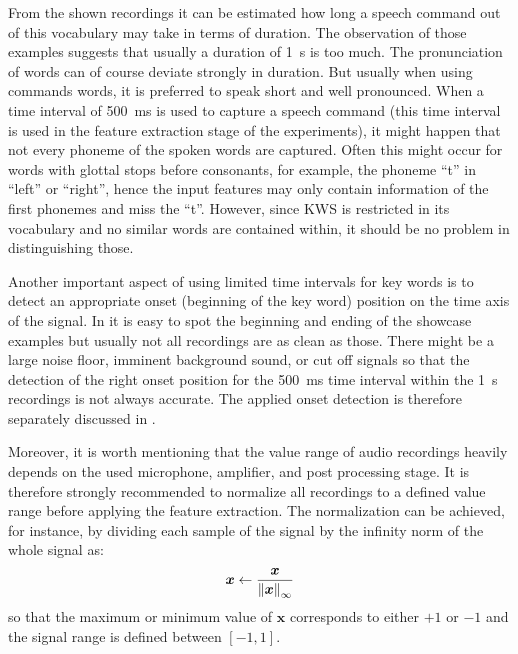 \FloatBarrier
\noindent
From the shown recordings it can be estimated how long a speech command out of this vocabulary may take in terms of duration.
The observation of those examples suggests that usually a duration of \SI{1}{\second} is too much.
The pronunciation of words can of course deviate strongly in duration.
But usually when using commands words, it is preferred to speak short and well pronounced.
When a time interval of \SI{500}{\milli\second} is used to capture a speech command (this time interval is used in the feature extraction stage of the experiments), it might happen that not every phoneme of the spoken words are captured.
Often this might occur for words with glottal stops before consonants, for example, the phoneme \enquote{t} in \enquote{left} or \enquote{right}, hence the input features may only contain information of the first phonemes and miss the \enquote{t}.
However, since KWS is restricted in its vocabulary and no similar words are contained within, it should be no problem in distinguishing those.

Another important aspect of using limited time intervals for key words is to detect an appropriate onset (beginning of the key word) position on the time axis of the signal.
In  it is easy to spot the beginning and ending of the showcase examples but usually not all recordings are as clean as those.
There might be a large noise floor, imminent background sound, or cut off signals so that the detection of the right onset position for the \SI{500}{\milli\second} time interval within the \SI{1}{\second} recordings is not always accurate.
The applied onset detection is therefore separately discussed in .

Moreover, it is worth mentioning that the value range of audio recordings heavily depends on the used microphone, amplifier, and post processing stage.
It is therefore strongly recommended to normalize all recordings to a defined value range before applying the feature extraction.
The normalization can be achieved, for instance, by dividing each sample of the signal by the infinity norm of the whole signal as:
\begin{equation}
  \bm{x} \gets \frac{\bm{x}}{\norm{\bm{x}}_\infty}
\end{equation}
so that the maximum or minimum value of $\bm{x}$ corresponds to either $+1$ or $-1$ and the signal range is defined between $[-1, 1]$.